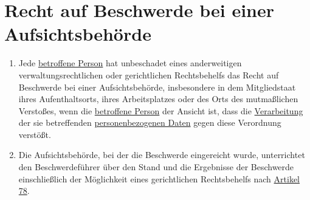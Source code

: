 \chapter{Recht auf Beschwerde bei einer Aufsichtsbehörde}
\label{ch:77}


\begin{enumerate}

  \item Jede \hyperref[itm:04-1]{betroffene Person} hat unbeschadet eines anderweitigen verwaltungsrechtlichen oder gerichtlichen
   Rechtsbehelfs das Recht auf Beschwerde bei einer Aufsichtsbehörde, insbesondere in dem Mitgliedstaat ihres
   Aufenthaltsorts, ihres Arbeitsplatzes oder des Orts des mutmaßlichen Verstoßes, wenn die \hyperref[itm:04-1]{betroffene Person} der
   Ansicht ist, dass die \hyperref[itm:04-2]{Verarbeitung} der sie betreffenden \hyperref[itm:04-1]{personenbezogenen Daten} gegen diese Verordnung verstößt.
  \label{itm:77-1}

  \item Die Aufsichtsbehörde, bei der die Beschwerde eingereicht wurde, unterrichtet den Beschwerdeführer über den Stand
   und die Ergebnisse der Beschwerde einschließlich der Möglichkeit eines gerichtlichen Rechtsbehelfs nach \hyperref
   [ch:78]{Artikel 78}.
  \label{itm:77-2}

\end{enumerate}


